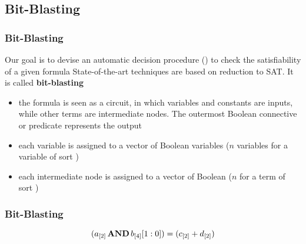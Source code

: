 \subsection{Bit-Blasting}

\begin{frame}
  \frametitle{Bit-Blasting}

Our goal is to devise an automatic decision procedure (\smtsolver)
to check the satisfiability of a given \bitvector formula
\vfill
\pause
State-of-the-art techniques are based on reduction to SAT. It is
called {\bf bit-blasting}
\vfill
\pause
\begin{itemize}
  \item the formula is seen as a circuit, in which
        variables and constants are inputs, while
        other terms are intermediate nodes. The outermost
        Boolean connective or predicate represents the output
\vfill
\pause

  \item each variable is assigned to a vector of Boolean variables
        ($n$ variables for a variable of sort )
\vfill
\pause

  \item each intermediate node is assigned to a vector of
	Boolean \formulae
        ($n$ \formulae for a term of sort )
\end{itemize}

\end{frame}

\begin{frame}
  \frametitle{Bit-Blasting}
  
  $$
  (a_{[2]} \,{\bf AND}\, b_{[4]}[1:0]) = (c_{[2]} + d_{[2]})  
  $$
  \vfill
  \begin{overlayarea}{\textwidth}{5cm}
  \begin{center}
  \end{center}
  \end{overlayarea}
  \vfill
  
\end{frame}

